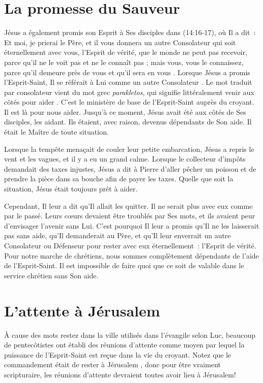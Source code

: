 \section*{La promesse du Sauveur}

Jésus a également promis son Esprit à Ses disciples dans
 (14:16-17), où Il a dit~:
 \og Et moi, je prierai le Père, et il vous donnera un autre Consolateur
 qui soit éternellement avec vous, l'Esprit de vérité, que le monde ne peut
 pas recevoir, parce qu'il ne le voit pas et ne le connaît pas ; mais vous,
 vous le connaissez, parce qu'il demeure près de vous et qu'il sera en vous \fg{}.
 Lorsque Jésus a promis l'Esprit-Saint, Il se référait à Lui comme
 \og un autre Consolateur \fg{}.
 Le mot traduit par consolateur vient du mot grec \emph{parakletos},
 qui signifie littéralement \og venir aux côtés pour aider \fg{}.
 C'est le ministère de base de l'Esprit-Saint auprès du croyant.
 Il est là pour nous aider. Jusqu'à ce moment, Jésus avait été aux côtés
 de Ses disciples, les aidant. Ils étaient, avec raison, devenus dépendants
 de Son aide. Il était le Maître de toute situation.

Lorsque la tempête menaçait de couler leur petite embarcation, Jésus
 a repris le vent et les vagues, et il y a eu un grand calme.
 Lorsque le collecteur d'impôts demandait des taxes injustes,
 Jésus a dit à Pierre d'aller pêcher un poisson et de prendre
 la pièce dans sa bouche afin de payer les taxes.
 Quelle que soit la situation, Jésus était toujours prêt à aider.

Cependant, Il leur a dit qu'Il allait les quitter.
 Il ne serait plus avec eux comme par le passé.
 Leurs cœurs devaient être troublés par Ses mots,
 et ils avaient peur d'envisager l'avenir sans Lui.
 C'est pourquoi Il leur a promis qu'Il ne les laisserait pas sans aide,
 qu'Il demanderait au Père, et qu'Il leur enverrait un autre Consolateur
 ou Défenseur pour rester avec eux éternellement~:
 l'Esprit de vérité.
 Pour notre marche de chrétiens, nous sommes complètement dépendants de
 l'aide de l'Esprit-Saint.
 Il est impossible de faire quoi que ce soit de valable dans le service
 chrétien sans Son aide.

\section*{L'attente à Jérusalem}

À cause des mots \og restez dans la ville \fg{} utilisés dans
 l'évangile selon Luc, beaucoup de pentecôtistes ont établi des \og réunions
 d'attente \fg{} comme moyen par lequel la puissance de l'Esprit-Saint est
 reçue dans la vie du croyant. Notez que le commandement était de \og rester
 à Jérusalem \fg{} ,
 donc pour être vraiment scripturaire, les réunions d'attente devraient toutes
 avoir lieu à Jérusalem!

